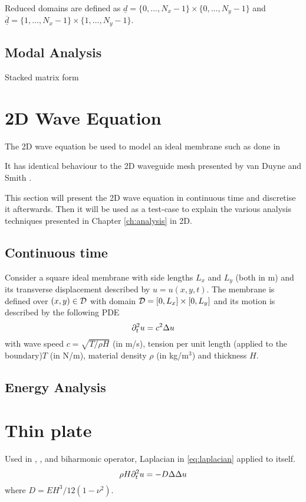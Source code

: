 Reduced domains are defined as $\underline{d} = \{0, \hdots, N_x-1\} \times \{0, \hdots, N_y-1\}$ and $\underline{\overline{d}} = \{1, \hdots, N_x-1\}\times\{1, \hdots, N_y-1\}$.

\subsection{Modal Analysis}
Stacked matrix form

\section{2D Wave Equation}
The 2D wave equation be used to model an ideal membrane such as done in 

It has identical behaviour to the 2D waveguide mesh presented by van Duyne and Smith \cite{Duyne1993}.

This section will present the 2D wave equation in continuous time and discretise it afterwards. Then it will be used as a test-case to explain the various analysis techniques presented in Chapter \ref{ch:analysis} in 2D.

\subsection{Continuous time}
Consider a square ideal membrane with side lengths $L_x$ and $L_y$ (both in m) and its transverse displacement described by $u = u(x,y,t)$. The membrane is defined over $(x,y) \in \mathcal{D}$ with domain $\mathcal{D} = [0, L_x] \times[0, L_y]$ and its motion is described by the following PDE
\begin{equation}\label{eq:2DwavePDE}
    \partial_t^2 u = c^2\Delta u
\end{equation}
with wave speed $c = \sqrt{T/\rho H}$ (in m/s), tension per unit length (applied to the boundary)$T$ (in N/m), material density $\rho$ (in kg/m$^3$) and thickness $H$.



\subsection{Energy Analysis}

\section{Thin plate}\label{sec:thinPlate}
Used in \citeP[A], \citeP[B], \citeP[D] and \citeP[E]
biharmonic operator, Laplacian in \eqref{eq:laplacian} applied to itself.
\begin{equation}\label{eq:platePDENoLosses}
    \rho H \partial_t^2 u = -D\Delta\Delta u
\end{equation}
where $D = EH^3/12(1-\nu^2)$.

